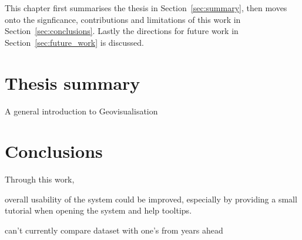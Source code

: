 
This chapter first summarises the thesis in Section~\ref{sec:summary}, then moves onto the signficance, contributions and limitations of this work in Section~\ref{sec:conclusions}. Lastly the directions for future work in Section~\ref{sec:future_work} is discussed.

\section{Thesis summary} {
\label{sec:summary}

	A general introduction to Geovisualisation

}

\section{Conclusions} {
\label{sec:conclusions}

	Through this work, 



	overall usability of the system could be improved, especially by providing a small tutorial when opening the system and help tooltips.	

	can't currently compare dataset with one's from years ahead

}

